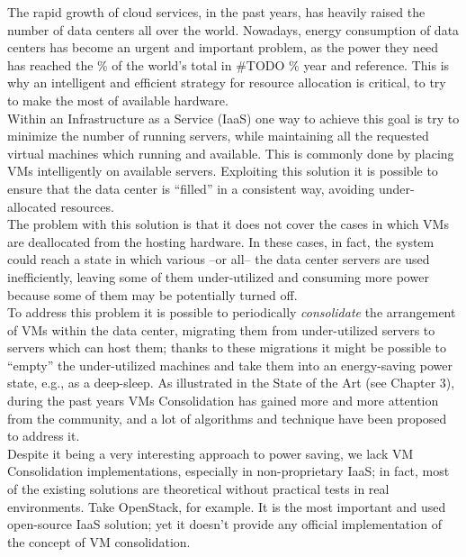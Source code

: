 

The rapid growth of cloud services, in the past years, has heavily raised the number of data centers all over the world. Nowadays, energy consumption of data centers has become an urgent and important problem, as the power they need has reached the \% of the world’s total in #TODO \% year and reference. This is why an intelligent and efficient strategy for resource allocation is critical, to try to make the most of available hardware.\\
Within an Infrastructure as a Service (IaaS) one way to achieve this goal is try to minimize the number of running servers, while maintaining all the requested virtual machines which running and available. This is commonly done by placing VMs intelligently on available servers.  Exploiting this solution it is possible to ensure that the data center is ``filled'' in a consistent way, avoiding under-allocated resources.\\
The problem with this solution is that it does not cover the cases in which VMs are deallocated from the hosting hardware. In these cases, in fact, the system could reach a state in which various --or all-- the data center servers are used inefficiently, leaving some of them under-utilized and consuming more power because some of them may be potentially turned off.\\
To address this problem it is possible to periodically \textit{consolidate} the arrangement of VMs within the data center, migrating them from under-utilized servers to servers which can host them; thanks to these migrations it might be possible to ``empty'' the under-utilized machines and take them into an energy-saving power state, e.g., as a deep-sleep. As illustrated in the State of the Art (see Chapter 3), during the past years VMs Consolidation has gained more and more attention from the community, and a lot of algorithms and technique have been proposed to address it.\\
Despite it being a very interesting approach to power saving, we lack VM Consolidation implementations, especially in non-proprietary IaaS; in fact, most of the existing solutions are theoretical without practical tests in real environments. Take OpenStack, for example. It is the most important and used open-source IaaS solution; yet it doesn’t provide any official implementation of the concept of VM consolidation.\\
